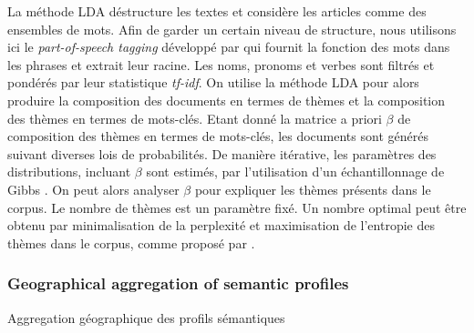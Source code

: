{}{
La méthode LDA déstructure les textes et considère les articles comme des ensembles de mots. Afin de garder un certain niveau de structure, nous utilisons ici le \textit{part-of-speech tagging} développé par \cite{schmid_probabilistic_1994} qui fournit la fonction des mots dans les phrases et extrait leur racine. Les noms, pronoms et verbes sont filtrés et pondérés par leur statistique \textit{tf-idf}. On utilise la méthode LDA pour alors produire la composition des documents en termes de thèmes et la composition des thèmes en termes de mots-clés. Etant donné la matrice a priori $\beta$ de composition des thèmes en termes de mots-clés, les documents sont générés suivant diverses lois de probabilités. De manière itérative, les paramètres des distributions, incluant $\beta$ sont estimés, par l'utilisation d'un échantillonnage de Gibbs \cite{geman_stochastic_1984}. On peut alors analyser $\beta$ pour expliquer les thèmes présents dans le corpus. Le nombre de thèmes est un paramètre fixé. Un nombre optimal peut être obtenu par minimalisation de la perplexité et maximisation de l'entropie des thèmes dans le corpus, comme proposé par \cite{blei2003latent}.
}



\subsubsection{Geographical aggregation of semantic profiles}{Aggregation géographique des profils sémantiques}


